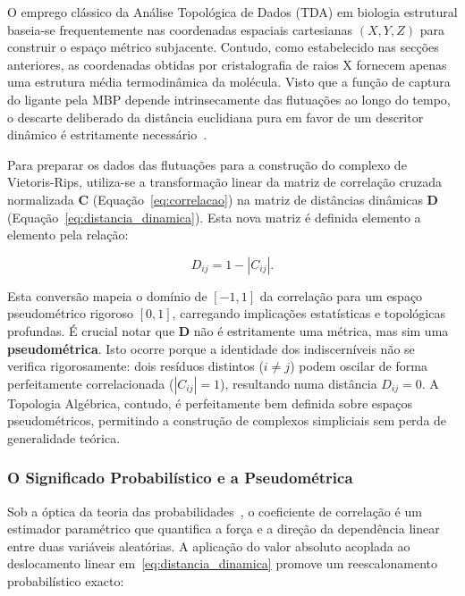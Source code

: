 \documentclass[12pt, a4paper]{article}
\newcommand{\ident}{\hspace{2em}}
\begin{document}
O emprego clássico da Análise Topológica de Dados (TDA) em biologia estrutural baseia-se frequentemente nas coordenadas espaciais cartesianas $(X, Y, Z)$ para construir o espaço métrico subjacente. Contudo, como estabelecido nas secções anteriores, as coordenadas obtidas por cristalografia de raios X fornecem apenas uma estrutura média termodinâmica da molécula. Visto que a função de captura do ligante pela MBP depende intrinsecamente das flutuações ao longo do tempo, o descarte deliberado da distância euclidiana pura em favor de um descritor dinâmico é estritamente necessário~\cite{kovacev2016}.

Para preparar os dados das flutuações para a construção do complexo de Vietoris-Rips, utiliza-se a transformação linear da matriz de correlação cruzada normalizada $\mathbf{C}$ (Equação~\ref{eq:correlacao}) na matriz de distâncias dinâmicas $\mathbf{D}$ (Equação~\ref{eq:distancia_dinamica}). Esta nova matriz é definida elemento a elemento pela relação:

\begin{equation}\label{eq:distancia_dinamica}
D_{ij} = 1 - |C_{ij}|.
\end{equation}

Esta conversão mapeia o domínio de $[-1, 1]$ da correlação para um espaço pseudométrico rigoroso $[0, 1]$, carregando implicações estatísticas e topológicas profundas. É crucial notar que $\mathbf{D}$ não é estritamente uma métrica, mas sim uma \textbf{pseudométrica}. Isto ocorre porque a identidade dos indiscerníveis não se verifica rigorosamente: dois resíduos distintos ($i \neq j$) podem oscilar de forma perfeitamente correlacionada ($|C_{ij}| = 1$), resultando numa distância $D_{ij} = 0$. A Topologia Algébrica, contudo, é perfeitamente bem definida sobre espaços pseudométricos, permitindo a construção de complexos simpliciais sem perda de generalidade teórica.

\subsubsection{O Significado Probabilístico e a Pseudométrica}

\ident Sob a óptica da teoria das probabilidades~\cite{devore2012}, o coeficiente de correlação é um estimador paramétrico que quantifica a força e a direção da dependência linear entre duas variáveis aleatórias. A aplicação do valor absoluto acoplada ao deslocamento linear em~\eqref{eq:distancia_dinamica} promove um reescalonamento probabilístico exacto:
\end{document}
